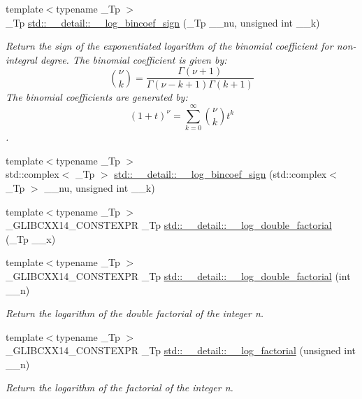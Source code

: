 \begin{DoxyCompactItemize}
{\footnotesize template$<$typename \+\_\+\+Tp $>$ }\\\+\_\+\+Tp \hyperlink{namespacestd_1_1____detail_a6cea85f06264c3c9b05a76012205a0ca}{std\+::\+\_\+\+\_\+detail\+::\+\_\+\+\_\+log\+\_\+bincoef\+\_\+sign} (\+\_\+\+Tp \+\_\+\+\_\+nu, unsigned int \+\_\+\+\_\+k)
\begin{DoxyCompactList}\small\item\em Return the sign of the exponentiated logarithm of the binomial coefficient for non-\/integral degree. The binomial coefficient is given by\+: \[ \binom{\nu}{k} = \frac{\Gamma(\nu+1)}{\Gamma(\nu-k+1) \Gamma(k+1)} \] The binomial coefficients are generated by\+: \[ \left(1 + t\right)^\nu = \sum_{k=0}^\infty \binom{\nu}{k} t^k \]. \end{DoxyCompactList}\item 
{\footnotesize template$<$typename \+\_\+\+Tp $>$ }\\std\+::complex$<$ \+\_\+\+Tp $>$ \hyperlink{namespacestd_1_1____detail_acaa1cf71cfd1d1ec4e897a9b9d10e8a1}{std\+::\+\_\+\+\_\+detail\+::\+\_\+\+\_\+log\+\_\+bincoef\+\_\+sign} (std\+::complex$<$ \+\_\+\+Tp $>$ \+\_\+\+\_\+nu, unsigned int \+\_\+\+\_\+k)
\item 
{\footnotesize template$<$typename \+\_\+\+Tp $>$ }\\\+\_\+\+G\+L\+I\+B\+C\+X\+X14\+\_\+\+C\+O\+N\+S\+T\+E\+X\+PR \+\_\+\+Tp \hyperlink{namespacestd_1_1____detail_a0de46e790512550b535bdda97e11e1b5}{std\+::\+\_\+\+\_\+detail\+::\+\_\+\+\_\+log\+\_\+double\+\_\+factorial} (\+\_\+\+Tp \+\_\+\+\_\+x)
\item 
{\footnotesize template$<$typename \+\_\+\+Tp $>$ }\\\+\_\+\+G\+L\+I\+B\+C\+X\+X14\+\_\+\+C\+O\+N\+S\+T\+E\+X\+PR \+\_\+\+Tp \hyperlink{namespacestd_1_1____detail_aa832ed1d29fd41c40cf892cc1feef7e9}{std\+::\+\_\+\+\_\+detail\+::\+\_\+\+\_\+log\+\_\+double\+\_\+factorial} (int \+\_\+\+\_\+n)
\begin{DoxyCompactList}\small\item\em Return the logarithm of the double factorial of the integer n. \end{DoxyCompactList}\item 
{\footnotesize template$<$typename \+\_\+\+Tp $>$ }\\\+\_\+\+G\+L\+I\+B\+C\+X\+X14\+\_\+\+C\+O\+N\+S\+T\+E\+X\+PR \+\_\+\+Tp \hyperlink{namespacestd_1_1____detail_a2809419dbbe9fc60066dacfdc13761d4}{std\+::\+\_\+\+\_\+detail\+::\+\_\+\+\_\+log\+\_\+factorial} (unsigned int \+\_\+\+\_\+n)
\begin{DoxyCompactList}\small\item\em Return the logarithm of the factorial of the integer n. \end{DoxyCompactList}\item 

\end{DoxyCompactItemize}
